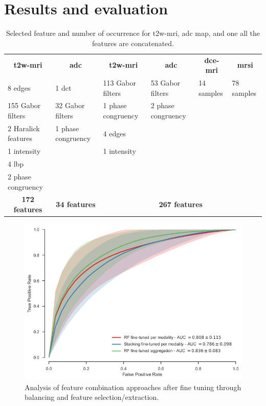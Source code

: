 \documentclass[conference]{sty/ieeeconf}
\begin{document}
\section{Results and evaluation} \label{sc:results}

\begin{table}
  \caption{Selected feature and number of occurrence for \acs*{t2w}-\acs*{mri}, \acs*{adc} map, and one all the features are concatenated.}
  \centering
  \begin{tabular}{llllll}
    \toprule
    \multicolumn{1}{c}{\textbf{\acs*{t2w}-\acs*{mri}}} & \multicolumn{1}{c}{\textbf{\acs*{adc}}} & \multicolumn{1}{c}{\textbf{\acs*{t2w}-\acs*{mri}}} & \multicolumn{1}{c}{\textbf{\acs*{adc}}} & \multicolumn{1}{c}{\textbf{\acs*{dce}-\acs*{mri}}} & \multicolumn{1}{c}{\textbf{\acs*{mrsi}}} \\
    \cmidrule(lr){1-1} \cmidrule(lr){2-2} \cmidrule(lr){3-6}
    8 edges & 1 \acs*{dct} & 113 Gabor filters & 53 Gabor filters & 14 samples  & 78 samples \\
    155 Gabor filters & 32 Gabor filters & 1 phase congruency & 2 phase congruency & & \\
    2 Haralick features & 1 phase congruency & 4 edges & & & \\
    1 intensity & & 1 intensity & & & \\
    4 \acs*{lbp} & & & & & \\
    2 phase congruency & & & & & \\
    \cmidrule(lr){1-1} \cmidrule(lr){2-2} \cmidrule(lr){3-6}
    \multicolumn{1}{c}{\textbf{172 features}} & \multicolumn{1}{c}{\textbf{34 features}} & \multicolumn{4}{c}{\textbf{267 features}} \\
    \bottomrule
  \end{tabular}
  \label{tab:selfeatocc}
\end{table}

\begin{figure}
\centering
 \includegraphics[width=0.9\linewidth]{figures/combine_all.png}
  \caption[Analysis of feature combination approaches after fine
  tuning.]{Analysis of feature combination approaches after fine
    tuning through balancing and feature selection/extraction.}
  \label{fig:res-Ex4}
\end{figure}
\end{document}
